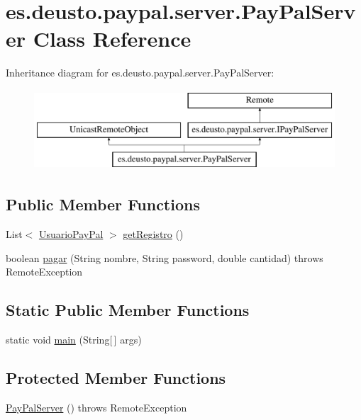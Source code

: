 \hypertarget{classes_1_1deusto_1_1paypal_1_1server_1_1_pay_pal_server}{}\section{es.\+deusto.\+paypal.\+server.\+Pay\+Pal\+Server Class Reference}
\label{classes_1_1deusto_1_1paypal_1_1server_1_1_pay_pal_server}
Inheritance diagram for es.\+deusto.\+paypal.\+server.\+Pay\+Pal\+Server\+:\begin{figure}[H]
\begin{center}
\leavevmode
\includegraphics[height=3.000000cm]{classes_1_1deusto_1_1paypal_1_1server_1_1_pay_pal_server}
\end{center}
\end{figure}
\subsection*{Public Member Functions}
\begin{DoxyCompactItemize}
\item 
List$<$ \mbox{\hyperlink{classes_1_1deusto_1_1paypal_1_1data_1_1_usuario_pay_pal}{Usuario\+Pay\+Pal}} $>$ \mbox{\hyperlink{classes_1_1deusto_1_1paypal_1_1server_1_1_pay_pal_server_a7c7b87f4ed0d3ef52eb26ef5bb5a9ae0}{get\+Registro}} ()
\item 
boolean \mbox{\hyperlink{classes_1_1deusto_1_1paypal_1_1server_1_1_pay_pal_server_a3043b77ba4e3b895209cf5f71a52294a}{pagar}} (String nombre, String password, double cantidad)  throws Remote\+Exception 
\end{DoxyCompactItemize}
\subsection*{Static Public Member Functions}
\begin{DoxyCompactItemize}
\item 
static void \mbox{\hyperlink{classes_1_1deusto_1_1paypal_1_1server_1_1_pay_pal_server_aed1c54a394bd6f4614877348194a4ad6}{main}} (String\mbox{[}$\,$\mbox{]} args)
\end{DoxyCompactItemize}
\subsection*{Protected Member Functions}
\begin{DoxyCompactItemize}
\item 
\mbox{\hyperlink{classes_1_1deusto_1_1paypal_1_1server_1_1_pay_pal_server_ac24fdc4af5720a4c3a12a85f7d985d5a}{Pay\+Pal\+Server}} ()  throws Remote\+Exception 
\end{DoxyCompactItemize}


